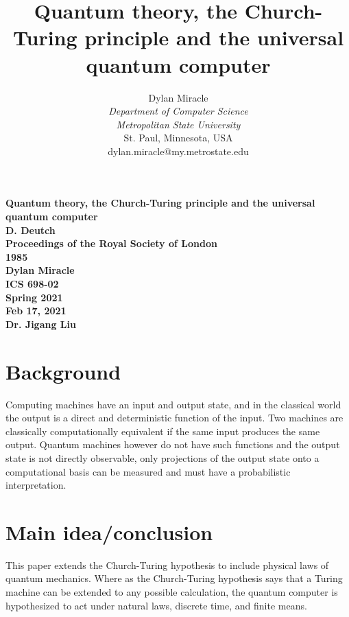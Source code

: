 \documentclass{article}
\begin{document}
\begin{titlepage}
    \begin{center}
        \vspace{4cm}
        \Huge
        \textbf{
            Quantum theory, the Church-Turing principle and the universal quantum computer \\
            D. Deutch \\
            Proceedings of the Royal Society of London \\
            1985 \\
            Dylan Miracle \\
            ICS 698-02 \\
            Spring 2021 \\
            Feb 17, 2021 \\
            Dr. Jigang Liu
        }
    \end{center}
\end{titlepage}
\title{Quantum theory, the Church-Turing principle and the universal quantum computer}

\author{Dylan Miracle\\
\textit{Department of Computer Science} \\
\textit{Metropolitan State University}\\
St. Paul, Minnesota, USA \\
dylan.miracle@my.metrostate.edu
}

\maketitle
\section{Background}
Computing machines have an input and output state, and in the classical world the output is a direct and deterministic function of the input. Two machines are classically computationally equivalent if the same input produces the same output. Quantum machines however do not have such functions and the output state is not directly observable, only projections of the output state onto a computational basis can be measured and must have a probabilistic interpretation.

\section{Main idea/conclusion}

This paper extends the Church-Turing hypothesis to include physical laws of quantum mechanics. Where as the Church-Turing hypothesis says that a Turing machine can be extended to any possible calculation, the quantum computer is hypothesized to act under natural laws, discrete time, and finite means.
\end{document}
